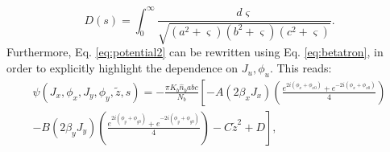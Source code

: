 \begin{equation}
    \label{eq:D}
    D(s)=\int_0^{\infty}{\frac{d \varsigma }{\sqrt{\left( a^2+ \varsigma \right) \left( b^2+ \varsigma \right) \left( c^2+ \varsigma \right)}}}.
\end{equation}
Furthermore, Eq. \ref{eq:potential2} can be rewritten using Eq. \ref{eq:betatron}, in order to explicitly highlight the dependence on $J_u,\phi_u$. This reads:
\begin{multline}
    \label{eq:potential3}
    \psi(J_x,\phi_x, J_y, \phi_y, \tilde{z},s)=-\frac{\pi K_b \hat{n}_b a b c }{N_b} \left[ -A \left( 2 \beta_x J_x \right) \left( \frac{e^{2i(\phi_x+\phi_{x0})}+e^{-2i(\phi_x+\phi_{x0})}}{4} \right) \right. \\
    \left. -B \left( 2 \beta_y J_y \right) \left( \frac{e^{2i(\phi_y+\phi_{y0})}+e^{-2i(\phi_y+\phi_{y0})}}{4}\right) - C \tilde{z}^2 +D  \right],
\end{multline}